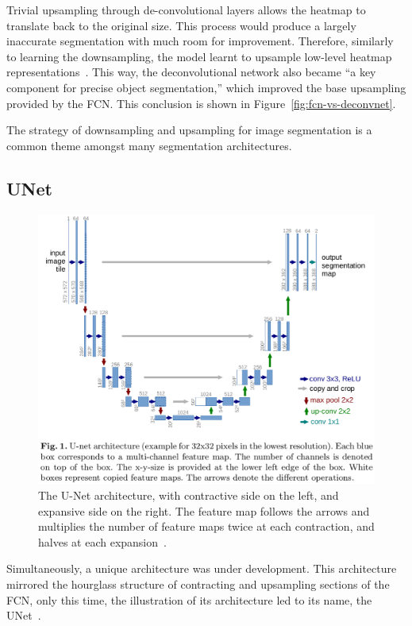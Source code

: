 \documentclass[12pt,twoside]{report}
\begin{document}
Trivial upsampling through de-convolutional layers allows the heatmap to translate back to the original size. This process would produce a largely inaccurate segmentation with much room for improvement. Therefore, similarly to learning the downsampling, the model learnt to upsample low-level heatmap representations~\cite{noh2015learning}. This way, the deconvolutional network also became ``a key component for precise object segmentation,'' which improved the base upsampling provided by the FCN. This conclusion is shown in Figure~\ref{fig:fcn-vs-deconvnet}.

The strategy of downsampling and upsampling for image segmentation is a common theme amongst many segmentation architectures.

\subsection{UNet}

\begin{figure}[H]
  \centering
  \includegraphics[width=.9\linewidth, trim=0 200px 0 0, clip]{../figures/u-net.png}
  \caption{The U-Net architecture, with contractive side on the left, and expansive side on the right. The feature map follows the arrows and multiplies the number of feature maps twice at each contraction, and halves at each expansion~\cite{U-Net}.}\label{fig:unet}
\end{figure}


Simultaneously, a unique architecture was under development. This architecture mirrored the hourglass structure of contracting and upsampling sections of the FCN, only this time, the illustration of its architecture led to its name, the UNet~\cite{U-Net}.
\end{document}
